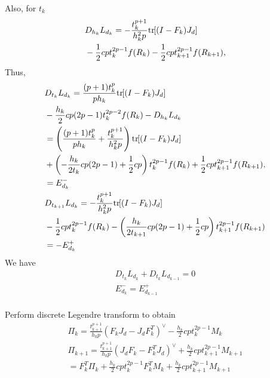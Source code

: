 \documentclass[letterpaper, 10pt, conference]{ieeeconf}
\newcommand{\bracket}[1]{\ensuremath{\left[ #1 \right]}}
\newcommand{\parenth}[1]{\ensuremath{\left( #1 \right)}}
\newcommand{\tr}[1]{\mbox{tr}\ensuremath{\negthickspace\bracket{#1}}}
\begin{document}
Also, for $t_k$
\begin{align*}
    & D_{h_k} L_{d_k} = -\frac{t^{p+1}_{k}}{h_k^2 p} \tr{(I-F_k)J_d}\\
    & - \frac{1}{2}c p t_k^{2p-1} f(R_k) - \frac{1}{2}c p t_{k+1}^{2p-1} f(R_{k+1}),\\
\end{align*}
Thus,
\begin{align*}
    & D_{t_k} L_{d_k} = 
    \frac{(p+1)t_k^p}{p h_k} \tr{(I-F_k)J_d}  \\
    & -\frac{h_k}{2}cp(2p-1) t_k^{2p-2} f(R_k)  - D_{h_k} L_{d_k} \\
    & = \parenth{ \frac{(p+1)t_k^p}{p h_k} + \frac{t^{p+1}_{k}}{h_k^2 p} } \tr{(I-F_k)J_d} \\
    & + \parenth{- \frac{h_k}{2 t_k}cp(2p-1) 
        + \frac{1}{2}c p} t_k^{2p-1} f(R_k) + \frac{1}{2}c p t_{k+1}^{2p-1} f(R_{k+1}),\\
    & = E^-_{d_k}\\
    & D_{t_{k+1}} L_{d_k} = -\frac{t^{p+1}_{k}}{h_k^2 p} \tr{(I-F_k)J_d} \\
    & - \frac{1}{2}c p t_k^{2p-1} f(R_k)
- \parenth{\frac{h_k}{2t_{k+1}}cp(2p-1)  + \frac{1}{2}c p}       t_{k+1}^{2p-1}  f(R_{k+1})  \\
    & = - E^+_{d_k}
\end{align*}
We have
\begin{gather*}
    D_{t_k} L_{d_k} + D_{t_k} L_{d_{k-1}} = 0\\
    E^-_{d_k} = E^+_{d_{k-1}} \\
\end{gather*}

Perform discrete Legendre transform to obtain
\begin{gather*}
    \Pi_k =\frac{t_{k+1}^{p+1} }{h_k p} (F_k J_d - J_dF_k^T)^\vee  -\frac{h_k}{2} cp t_k^{2p-1} M_k \\
    \Pi_{k+1} = \frac{t_{k+1}^{p+1} }{h_k p} (J_dF_k -F_k^T J_d)^\vee + \frac{h_k}{2} cpt^{2p-1}_{k+1} M_{k+1}\\
= F_k^T \Pi_k + \frac{h_k}{2} cp t_k^{2p-1} F_k^T M_k +\frac{h_k}{2} cpt^{2p-1}_{k+1} M_{k+1}
\end{gather*}
\end{document}
